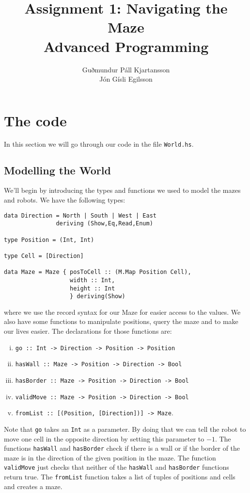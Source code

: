 \documentclass[a4paper,10pt]{article}
\title{
	Assignment 1: Navigating the Maze\\
	Advanced Programming
  }
\author{
	Guðmundur Páll Kjartansson\\
	Jón Gísli Egilsson	
}
\begin{document}
\maketitle

\section{The code}

In this section we will go through our code in the file \verb=World.hs=.

\subsection{Modelling the World}

We'll begin by introducing the types and functions we used to model the mazes and robots. We have the following types:
\begin{verbatim}
data Direction = North | South | West | East 
               deriving (Show,Eq,Read,Enum)

type Position = (Int, Int)

type Cell = [Direction]

data Maze = Maze { posToCell :: (M.Map Position Cell),
                   width :: Int,
                   height :: Int 
                   } deriving(Show)
\end{verbatim}
where we use the record syntax for our Maze for easier access to the values. We also have some functions to manipulate positions, query the maze and to make our lives easier. The declarations for those functions are:
\begin{enumerate}[i.]
	\item \verb=go :: Int -> Direction -> Position -> Position=
	\item \verb=hasWall :: Maze -> Position -> Direction -> Bool=
	\item \verb=hasBorder :: Maze -> Position -> Direction -> Bool=
	\item \verb=validMove :: Maze -> Position -> Direction -> Bool=
	\item \verb=fromList :: [(Position, [Direction])] -> Maze=.
\end{enumerate}
Note that \verb=go= takes an \verb=Int= as a parameter. By doing that we can tell the robot to move one cell in the opposite direction by setting this parameter to $-1$. The functions \verb=hasWall= and \verb=hasBorder= check if there is a wall or if the border of the maze is in the direction of the given position in the maze. The function \verb=validMove= just checks that neither of the \verb=hasWall= and \verb=hasBorder= functions return true. The \verb=fromList= function takes a list of tuples of positions and cells and creates a maze.
\end{document}
